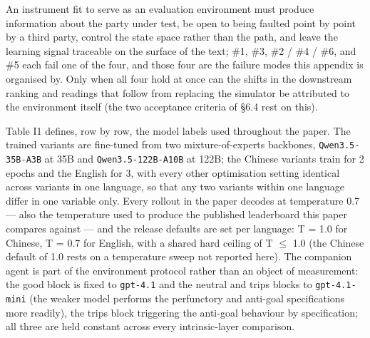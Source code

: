 \documentclass[letterpaper]{article}
\begin{document}
An instrument fit to serve as an evaluation environment must produce information about the party under test, be open to being faulted point by point by a third party, control the state space rather than the path, and leave the learning signal traceable on the surface of the text; \#1, \#3, \#2 / \#4 / \#6, and \#5 each fail one of the four, and those four are the failure modes this appendix is organised by. Only when all four hold at once can the shifts in the downstream ranking and readings that follow from replacing the simulator be attributed to the environment itself (the two acceptance criteria of \S{}6.4 rest on this).

\clearpage



Table I1 defines, row by row, the model labels used throughout the paper. The trained variants are fine-tuned from two mixture-of-experts backbones, \texttt{Qwen3.5-35B-A3B} at 35B and \texttt{Qwen3.5-122B-A10B} at 122B; the Chinese variants train for 2 epochs and the English for 3, with every other optimisation setting identical across variants in one language, so that any two variants within one language differ in one variable only. Every rollout in the paper decodes at temperature 0.7 --- also the temperature used to produce the published leaderboard this paper compares against --- and the release defaults are set per language: T = 1.0 for Chinese, T = 0.7 for English, with a shared hard ceiling of T $\leq$ 1.0 (the Chinese default of 1.0 rests on a temperature sweep not reported here). The companion agent is part of the environment protocol rather than an object of measurement: the good block is fixed to \texttt{gpt-4.1} and the neutral and trips blocks to \texttt{gpt-4.1-mini} (the weaker model performs the perfunctory and anti-goal specifications more readily), the trips block triggering the anti-goal behaviour by specification; all three are held constant across every intrinsic-layer comparison.
\end{document}
